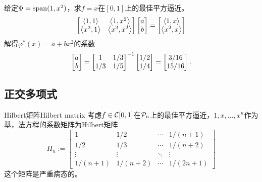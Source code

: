 \begin{example}
    {}{}
    给定$\Phi=\operatorname{span}(1,x^2)$，求$f=x$在$[0,1]$上的最佳平方逼近。
    \[
        \begin{bmatrix}
            \left\langle 1,1\right\rangle&\left\langle 1,x^2\right\rangle\\
            \left\langle x^2,1\right\rangle&\left\langle x^2,x^2\right\rangle
        \end{bmatrix}\begin{bmatrix}
            a\\b
        \end{bmatrix}=\begin{bmatrix}
            \left\langle 1,x\right\rangle\\\left\langle x^2,x\right\rangle
        \end{bmatrix}
    \]
    解得$\varphi^*(x)=a+bx^2$的系数
    \[
        \begin{bmatrix}
            a\\b
        \end{bmatrix}=\begin{bmatrix}
            1&1/3\\1/3&1/5
        \end{bmatrix}^{-1}\begin{bmatrix}
            1/2\\1/4
        \end{bmatrix}=\begin{bmatrix}
            3/16\\15/16
        \end{bmatrix}.
    \]
\end{example}

\subsection{正交多项式}

\begin{definition}
    {Hilbert矩阵}{Hilbert matrix}
    考虑$f\in\mathcal C[0,1]$在$\mathcal P_n$上的最佳平方逼近，$1,x,\ldots,x^n$作为基，法方程的系数矩阵为Hilbert矩阵
    \begin{equation}
        H_n:=\begin{bmatrix}
            1&1/2&\cdots&1/(n+1)\\
            1/2&1/3&\cdots&1/(n+2)\\
            \vdots&\vdots&\ddots&\vdots\\
            1/(n+1)&1/(n+2)&\cdots&1/(2n+1)
        \end{bmatrix}
    \end{equation}
    这个矩阵是严重病态的。
\end{definition}

